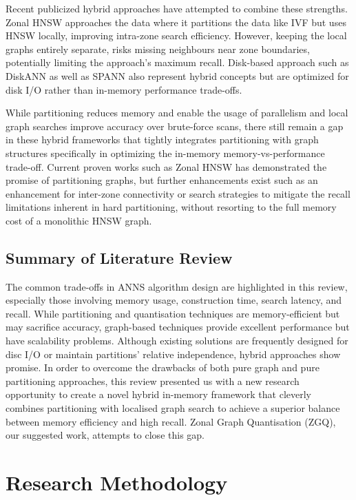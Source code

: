\documentclass[conference]{IEEEtran}
\begin{document}
Recent publicized hybrid approaches have attempted to combine these strengths. Zonal HNSW approaches the data where it partitions the data like IVF but uses HNSW locally, improving intra-zone search efficiency. However, keeping the local graphs entirely separate, risks missing neighbours near zone boundaries, potentially limiting the approach's maximum recall. Disk-based approach such as DiskANN as well as SPANN also represent hybrid concepts but are optimized for disk I/O rather than in-memory performance trade-offs.

While partitioning reduces memory and enable the usage of parallelism and local graph searches improve accuracy over brute-force scans, there still remain a gap in these hybrid frameworks that tightly integrates partitioning with graph structures specifically in optimizing the in-memory memory-vs-performance trade-off. Current proven works such as Zonal HNSW has demonstrated the promise of partitioning graphs, but further enhancements exist such as an enhancement for inter-zone connectivity or search strategies to mitigate the recall limitations inherent in hard partitioning, without resorting to the full memory cost of a monolithic HNSW graph.

\subsection{Summary of Literature Review}
The common trade-offs in ANNS algorithm design are highlighted in this review, especially those involving memory usage, construction time, search latency, and recall. While partitioning and quantisation techniques are memory-efficient but may sacrifice accuracy, graph-based techniques provide excellent performance but have scalability problems. Although existing solutions are frequently designed for disc I/O or maintain partitions' relative independence, hybrid approaches show promise. In order to overcome the drawbacks of both pure graph and pure partitioning approaches, this review presented us with a new research opportunity to create a novel hybrid in-memory framework that cleverly combines partitioning with localised graph search to achieve a superior balance between memory efficiency and high recall. Zonal Graph Quantisation (ZGQ), our suggested work, attempts to close this gap.


\section{Research Methodology}
\end{document}
